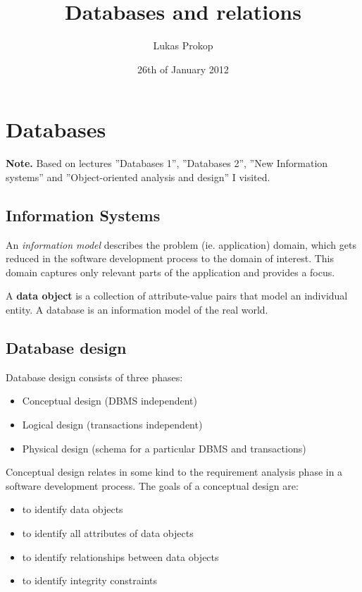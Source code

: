 \documentclass[a4paper,twocolumn]{article}
\author{Lukas Prokop}
\title{Databases and relations}
\date{26th of January 2012}
\begin{document}
\maketitle
\tableofcontents

\section{Databases}

\textbf{Note.} Based on lectures ''Databases 1'', ''Databases 2'', ''New
Information systems'' and ''Object-oriented analysis and design'' I visited.

\subsection{Information Systems}

An \emph{information model} describes the problem (ie. application) domain,
which gets reduced in the software development process to the domain of
interest. This domain captures only relevant parts of the application and
provides a focus.

A \textbf{data object} is a collection of attribute-value pairs that model
an individual entity. A database is an information model of the real world.

\subsection{Database design}

Database design consists of three phases:
%
\begin{itemize}
  \item Conceptual design (DBMS independent)
  \item Logical design (transactions independent)
  \item Physical design (schema for a particular DBMS and transactions)
\end{itemize}

Conceptual design relates in some kind to the requirement analysis phase in
a software development process. The goals of a conceptual design are:
%
\begin{itemize}
  \item to identify data objects
  \item to identify all attributes of data objects
  \item to identify relationships between data objects
  \item to identify integrity constraints
\end{itemize}
\end{document}
